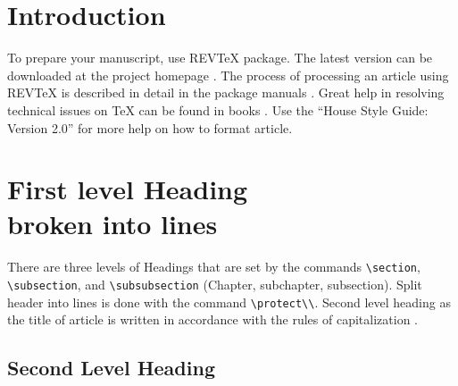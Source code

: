\documentclass[
11pt,%
tightenlines,%
twoside,%
onecolumn,%
nofloats,%
nobibnotes,%
nofootinbib,%
superscriptaddress,%
noshowpacs,%
centertags]%
{revtex4}
\begin{document}


\maketitle


\section{Introduction}

To prepare your manuscript, use REV\TeX{} package. The latest version can be downloaded at the project homepage \cite{RTeXHome}.
The process of processing an article using REV\TeX{} is described in detail in the package manuals \cite{RTeX}. Great help in resolving technical
issues on \TeX{} can be found in books \cite{texbook,L,GG,KD}.
Use the ``House Style Guide: Version 2.0'' \cite{hsg} for more help on how to format article.

\section{First level Heading\protect\\
broken into lines}

There are three levels of Headings that are set by the commands
\verb|\section|, \verb|\subsection|, and \verb|\subsubsection|
(Chapter, subchapter, subsection). Split header into lines
is done with the command \verb+\protect\\+.
Second level heading as the title of article is written in accordance with the rules of capitalization \cite{cap}.

\subsection{Second Level Heading}
\end{document}
